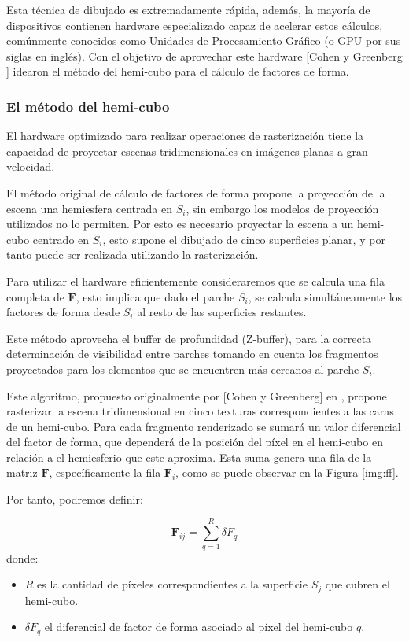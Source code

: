Esta técnica de dibujado es extremadamente rápida, además, la mayoría de dispositivos contienen hardware especializado capaz de acelerar estos cálculos, comúnmente conocidos como Unidades de Procesamiento Gráfico (o GPU por sus siglas en inglés). Con el objetivo de aprovechar este hardware [Cohen y Greenberg \cite{Cohen}] idearon el método del hemi-cubo para el cálculo de factores de forma.

\subsubsection{El método del hemi-cubo}

El hardware optimizado para realizar operaciones de rasterización tiene la capacidad de proyectar escenas tridimensionales en imágenes planas a gran velocidad. 

El método original de cálculo de factores de forma propone la proyección de la escena una hemiesfera centrada en $S_{i}$, sin embargo los modelos de proyección utilizados no lo permiten. Por esto es necesario proyectar la escena a un hemi-cubo centrado en $S_{i}$, esto supone el dibujado de cinco superficies planar, y por tanto puede ser realizada utilizando la rasterización.

Para utilizar el hardware eficientemente consideraremos que se calcula una fila completa de $\mathbf{F}$, esto implica que dado el parche $S_{i}$, se calcula simultáneamente los factores de forma desde $S_{i}$ al resto de las superficies restantes. 

Este método aprovecha el buffer de profundidad (Z-buffer), para la correcta determinación de visibilidad entre parches tomando en cuenta los fragmentos proyectados para los elementos que se encuentren más cercanos al parche $S_{i}$.

Este algoritmo, propuesto originalmente por [Cohen y Greenberg] en \citeyear{Cohen}, propone rasterizar la escena tridimensional en cinco texturas correspondientes a las caras de un hemi-cubo. Para cada fragmento renderizado se sumará un valor diferencial del factor de forma, que dependerá de la posición del píxel en el hemi-cubo en relación a el hemiesferio que este aproxima.  Esta suma genera una fila de la matriz $\mathbf{F}$, específicamente la fila $\mathbf{F}_{i}$, como se puede observar en la Figura \ref{img:ff}.

Por tanto, podremos definir:

\begin{equation}
	\mathbf{F}_{ij} = \sum_{q=1}^{R} \delta{F_{q}}
	\label{eq:ffgreenberg}
\end{equation}
donde:
\begin{itemize}
	\item $R$ es la cantidad de píxeles correspondientes a la superficie $S_{j}$ que cubren el hemi-cubo.
	\item $\delta{F_{q}}$ el diferencial de factor de forma asociado al píxel del hemi-cubo $q$.
\end{itemize}

